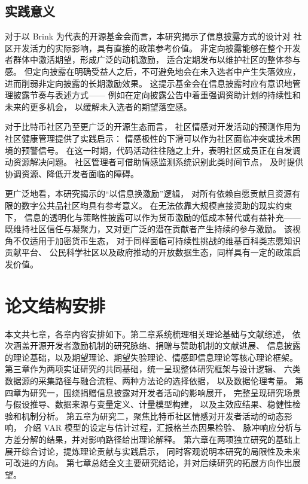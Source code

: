 \documentclass[
    type = master, %
    degree = professional,        %
    decl-page,  %
    twoside,                %
    fontset = fandol %
  ]{njuthesis}
\begin{document}
\subsection{实践意义}

对于以 Brink 为代表的开源基金会而言，本研究揭示了信息披露方式的设计对
社区开发活力的实际影响，具有直接的政策参考价值。
非定向披露能够在整个开发者群体中激活期望，形成广泛的动机激励，
适合定期发布以维护社区的整体参与感。
但定向披露在明确受益人之后，不可避免地会在未入选者中产生失落效应，
进而削弱非定向披露的长期激励效果。
这提示基金会在信息披露时应有意识地管理披露节奏与表述方式——
例如在定向披露公告中着重强调资助计划的持续性和未来的更多机会，
以缓解未入选者的期望落空感。

对于比特币社区乃至更广泛的开源生态而言，
社区情感对开发活动的预测作用为社区健康管理提供了实践启示：
情感极性的下滑可以作为社区面临冲突或技术困境的预警信号。
在这一时期，代码活动往往随之上升，表明社区成员正在自发调动资源解决问题。
社区管理者可借助情感监测系统识别此类时间节点，
及时提供协调资源、降低开发者面临的障碍。

更广泛地看，本研究揭示的“以信息换激励”逻辑，
对所有依赖自愿贡献且资源有限的数字公共品社区均具有参考意义。
在无法依靠大规模直接资助的现实约束下，
信息的透明化与策略性披露可以作为货币激励的低成本替代或有益补充——
既维持社区信任与凝聚力，又对更广泛的潜在贡献者产生持续的参与激励。
该视角不仅适用于加密货币生态，
对于同样面临可持续性挑战的维基百科类志愿知识贡献平台、
公民科学社区以及政府推动的开放数据生态，同样具有一定的政策启发价值。

\section{论文结构安排}

本文共七章，各章内容安排如下。第二章系统梳理相关理论基础与文献综述，
依次涵盖开源开发者激励机制的研究脉络、捐赠与赞助机制的文献进展、
信息披露的理论基础，以及期望理论、期望失验理论、情感即信息理论等核心理论框架。
第三章作为两项实证研究的共同基础，统一呈现整体研究框架与设计逻辑、
六类数据源的采集路径与融合流程、两种方法论的选择依据，
以及数据伦理考量。
第四章为研究一，围绕捐赠信息披露对开发者活动的影响展开，
完整呈现研究场景与假设推导、数据来源与变量定义、计量模型构建，
以及主效应结果、稳健性检验和机制分析。
第五章为研究二，聚焦比特币社区情感对开发者活动的动态影响，
介绍 VAR 模型的设定与估计过程，汇报格兰杰因果检验、
脉冲响应分析与方差分解的结果，并对影响路径给出理论解释。
第六章在两项独立研究的基础上展开综合讨论，提炼理论贡献与实践启示，
同时客观说明本研究的局限性及未来可改进的方向。
第七章总结全文主要研究结论，并对后续研究的拓展方向作出展望。
\end{document}
